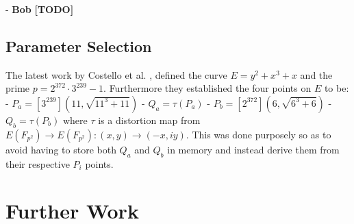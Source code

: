 \documentclass[10pt,twocolumn]{article} %
\begin{document}
- \textbf{Bob}
\textbf{[TODO]}

\subsection{Parameter Selection}
The latest work by Costello et al. \cite{bibid}, defined the curve $E = y^2+x^3 +x$ and the prime $p = 2^372\cdot 3^239-1$. Furthermore they established the four points on $E$ to be:
- $P_{a} = [3^239](11,\sqrt{11^3+11})$ \newline
- $Q_a=\tau(P_a)$ \newline
- $P_b=[2^372](6,\sqrt{6^3+6})$ \newline
- $Q_b=\tau(P_b)$ \newline
where $\tau$ is a distortion map from $E(F_{p^2})\rightarrow E(F_{p^2}) : (x,y) \rightarrow (-x,iy)$. This was done purposely so as to avoid having to store both $Q_a$ and $Q_b$ in memory and instead derive them from their respective $P_i$ points.

\section{Further Work}
\end{document}
